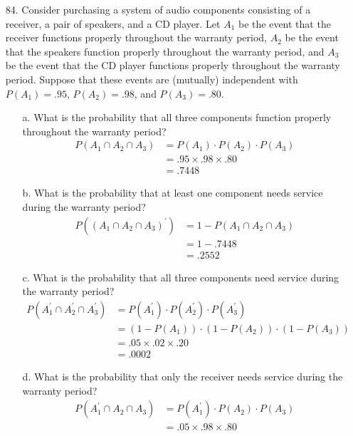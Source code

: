 \documentclass[letterpaper,12pt]{article}
\begin{document}
\begin{enumerate}
  \item[84.]
    Consider purchasing a system of audio components consisting of a receiver, a pair of speakers, and a CD player. Let $A_1$ be the event that the receiver functions properly throughout the warranty period, $A_2$ be the event that the speakers function properly throughout the warranty period, and $A_3$ be the event that the CD player functions properly throughout the warranty period. Suppose that these events are (mutually) independent with $P(A_1) = .95$, $P(A_2) = .98$, and $P(A_3) = .80$.
    \begin{enumerate}
      \item[a.]
        What is the probability that all three components function properly throughout the warranty period?
        \begin{align*}
          P(A_1 \cap A_2 \cap A_3) &= P(A_1) \cdot P(A_2) \cdot P(A_3) \\
          &= .95 \times .98 \times .80 \\
          &= .7448
        \end{align*}
      \item[b.]
        What is the probability that at least one component needs service during the warranty period?
        \begin{align*}
          P((A_1 \cap A_2 \cap A_3)^\prime) &= 1 - P(A_1 \cap A_2 \cap A_3) \\
          &= 1 - .7448 \\
          &= .2552
        \end{align*}
      \item[c.]
        What is the probability that all three components need service during the warranty period?
        \begin{align*}
          P(A_1^\prime \cap A_2^\prime \cap A_3^\prime) &= P(A_1^\prime) \cdot P(A_2^\prime) \cdot P(A_3^\prime) \\
          &= (1 - P(A_1)) \cdot (1 - P(A_2)) \cdot (1 - P(A_3)) \\
          &= .05 \times .02 \times .20 \\
          &= .0002
        \end{align*}
      \item[d.]
        What is the probability that only the receiver needs service during the warranty period?
        \begin{align*}
          P(A_1^\prime \cap A_2 \cap A_3) &= P(A_1^\prime) \cdot P(A_2) \cdot P(A_3) \\
          &= .05 \times .98 \times .80 \\

\end{align*}
\end{enumerate}
\end{enumerate}
\end{document}
